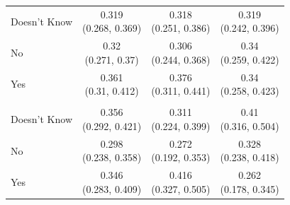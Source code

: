 \documentclass[
]{article}
\begin{document}
\begin{table}
\begin{tabular}[t]{lccc}
\addlinespace[0.3em]
\hline
\multicolumn{4}{l}{\textbf{Ink}}\\
\hline
\hspace{1em}Doesn't Know & \makecell[c]{0.319\\(0.268, 0.369)} & \makecell[c]{0.318\\(0.251, 0.386)} & \makecell[c]{0.319\\(0.242, 0.396)}\\
\hspace{1em}No & \makecell[c]{0.32\\(0.271, 0.37)} & \makecell[c]{0.306\\(0.244, 0.368)} & \makecell[c]{0.34\\(0.259, 0.422)}\\
\hspace{1em}Yes & \makecell[c]{0.361\\(0.31, 0.412)} & \makecell[c]{0.376\\(0.311, 0.441)} & \makecell[c]{0.34\\(0.258, 0.423)}\\
\addlinespace[0.3em]
\hline
\multicolumn{4}{l}{\textbf{Control}}\\
\hline
\hspace{1em}Doesn't Know & \makecell[c]{0.356\\(0.292, 0.421)} & \makecell[c]{0.311\\(0.224, 0.399)} & \makecell[c]{0.41\\(0.316, 0.504)}\\
\hspace{1em}No & \makecell[c]{0.298\\(0.238, 0.358)} & \makecell[c]{0.272\\(0.192, 0.353)} & \makecell[c]{0.328\\(0.238, 0.418)}\\
\hspace{1em}Yes & \makecell[c]{0.346\\(0.283, 0.409)} & \makecell[c]{0.416\\(0.327, 0.505)} & \makecell[c]{0.262\\(0.178, 0.345)}\\
\bottomrule
\end{tabular}
\end{table}
\end{document}

